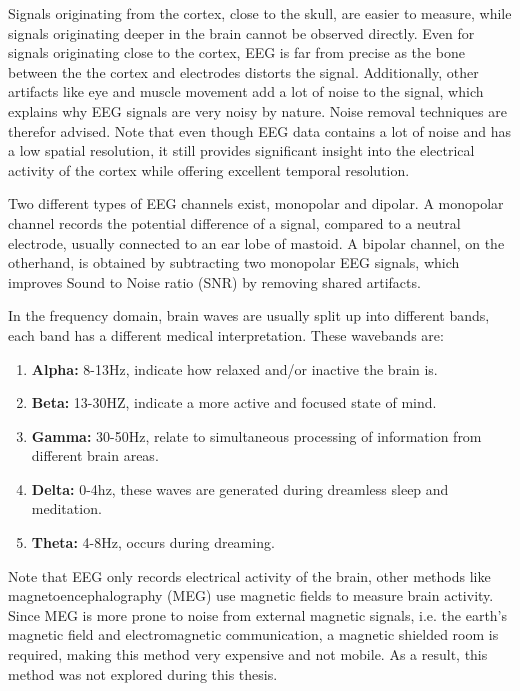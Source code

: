 
Signals originating from the cortex, close to the skull, are easier to measure, while signals originating deeper in the brain cannot be observed directly. Even for signals originating close to the cortex, EEG is far from precise as the bone between the the cortex and electrodes distorts the signal. Additionally, other artifacts like eye and muscle movement add a lot of noise to the signal, which explains why EEG signals are very noisy by nature. Noise removal techniques are therefor advised\citep{noiseRem}. Note that even though EEG data contains a lot of noise and has a low spatial resolution, it still provides significant insight into the electrical activity of the cortex while offering excellent temporal resolution\cite{GivenPaper}.

\npar

Two different types of EEG channels exist, monopolar and dipolar. A monopolar channel records the potential difference of a signal, compared to a neutral electrode, usually connected to an ear lobe of mastoid. A bipolar channel, on the otherhand, is obtained by subtracting two monopolar EEG signals, which improves Sound to Noise ratio (SNR)  by removing shared artifacts\cite{MonoBiPolar}. 

\npar 

In the frequency domain, brain waves are usually split up into different bands\cite{EmotionRelativePower,WavesSite}, each band has a different medical interpretation. These wavebands \label{wavebands} are:
\begin{enumerate}
\item \textbf{Alpha:} 8-13Hz, indicate how relaxed and/or inactive the brain is.
\item \textbf{Beta:} 13-30HZ, indicate a more active and focused state of mind.
\item \textbf{Gamma:} 30-50Hz, relate to simultaneous processing of information from different brain areas.
\item \textbf{Delta:} 0-4hz, these waves are generated during dreamless sleep and meditation.
\item \textbf{Theta:} 4-8Hz, occurs during dreaming.
\end{enumerate}

\npar

Note that EEG only records electrical activity of the brain, other methods like magnetoencephalography (MEG) use magnetic fields to measure brain activity\citep{meg}. Since MEG is more prone to noise from external magnetic signals, i.e. the earth's magnetic field and electromagnetic communication, a magnetic shielded room is required, making this method very expensive and not mobile. As a result, this method was not explored during this thesis. %


